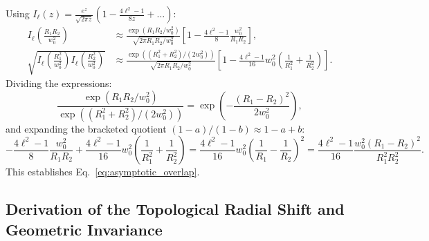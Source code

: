 \documentclass[11pt,a4paper]{article}
\begin{document}
Using $I_\ell(z) = \frac{e^z}{\sqrt{2\pi z}} (1 - \frac{4\ell^2 - 1}{8z} + \dots)$:
\begin{align}
I_\ell\left( \frac{R_1 R_2}{w_0^2} \right) &\approx \frac{\exp(R_1 R_2 / w_0^2)}{\sqrt{2\pi R_1 R_2 / w_0^2}} \left[ 1 - \frac{4\ell^2 - 1}{8} \frac{w_0^2}{R_1 R_2} \right], \\
\sqrt{I_\ell\left( \frac{R_1^2}{w_0^2} \right) I_\ell\left( \frac{R_2^2}{w_0^2} \right)} &\approx \frac{\exp((R_1^2 + R_2^2) / (2 w_0^2))}{\sqrt{2\pi R_1 R_2 / w_0^2}} \left[ 1 - \frac{4\ell^2 - 1}{16} w_0^2 \left( \frac{1}{R_1^2} + \frac{1}{R_2^2} \right) \right].
\end{align}
Dividing the expressions:
\begin{equation}
\frac{\exp(R_1 R_2 / w_0^2)}{\exp((R_1^2 + R_2^2) / (2 w_0^2))} = \exp\left( - \frac{(R_1 - R_2)^2}{2 w_0^2} \right),
\end{equation}
and expanding the bracketed quotient $(1 - a)/(1 - b) \approx 1 - a + b$:
\begin{equation}
- \frac{4\ell^2 - 1}{8} \frac{w_0^2}{R_1 R_2} + \frac{4\ell^2 - 1}{16} w_0^2 \left( \frac{1}{R_1^2} + \frac{1}{R_2^2} \right) = \frac{4\ell^2 - 1}{16} w_0^2 \left( \frac{1}{R_1} - \frac{1}{R_2} \right)^2 = \frac{4\ell^2 - 1}{16} \frac{w_0^2 (R_1 - R_2)^2}{R_1^2 R_2^2}.
\end{equation}
This establishes Eq.~\eqref{eq:asymptotic_overlap}.

\subsection{Derivation of the Topological Radial Shift and Geometric Invariance}
\end{document}
